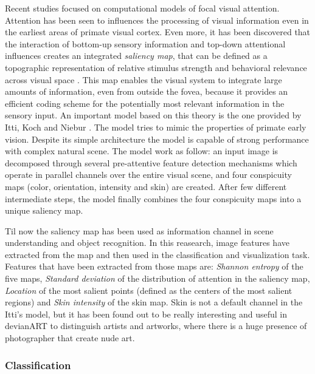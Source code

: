 Recent studies focused on computational models of focal visual attention. Attention has been seen to influences the processing of visual information even in the earliest areas of primate visual cortex. Even more, it has been discovered that the interaction of bottom-up sensory information and top-down attentional influences creates an integrated \textit{saliency map}, that can be defined as a topographic representation of relative stimulus strength and behavioral relevance across visual space \cite{Saliency_WWHW}. This map enables the visual system to integrate large amounts of information, even from outside the fovea, because it provides an efficient coding scheme for the potentially most relevant information in the sensory input. 
An important model based on this theory is the one provided by Itti, Koch and Niebur \cite{Itti_review}\cite{Itti_model}. The model tries to mimic the properties of primate early vision. Despite its simple architecture the model is capable of strong performance with complex natural scene.
The model work as follow: an input image is decomposed through several pre-attentive feature detection mechanisms which operate in parallel channels over the entire visual scene, and four conspicuity maps (color, orientation, intensity and skin) are created. After few different intermediate steps, the model finally combines the four conspicuity maps into a unique saliency map. 

Til now the saliency map has been used as information channel in scene understanding and object recognition. In this reasearch, image features have extracted from the map and then used in the classification and visualization task. Features that have been extracted from those maps are: \textit{Shannon entropy} of the five maps, \textit{Standard deviation} of the distribution of attention in the saliency map, \textit{Location} of the most salient points (defined as the centers of the most salient regions) and \textit{Skin intensity} of the skin map. Skin is not a default channel in the Itti's model, but it has been found out to be really interesting and useful in devianART to distinguish artists and artworks, where there is a huge presence of photographer that create nude art. 





\subsubsection{Classification}

